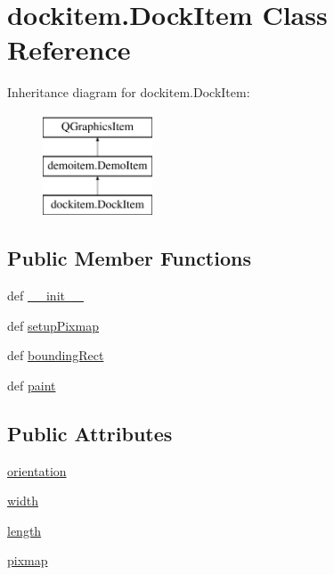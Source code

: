 \hypertarget{classdockitem_1_1DockItem}{}\section{dockitem.\+Dock\+Item Class Reference}
\label{classdockitem_1_1DockItem}
Inheritance diagram for dockitem.\+Dock\+Item\+:\begin{figure}[H]
\begin{center}
\leavevmode
\includegraphics[height=3.000000cm]{classdockitem_1_1DockItem}
\end{center}
\end{figure}
\subsection*{Public Member Functions}
\begin{DoxyCompactItemize}
\item 
def \hyperlink{classdockitem_1_1DockItem_aeb16b7a2201d63902790f436a0c7dafa}{\+\_\+\+\_\+init\+\_\+\+\_\+}
\item 
def \hyperlink{classdockitem_1_1DockItem_a3a46b9c8be0cf26210d91e66bf91cb5a}{setup\+Pixmap}
\item 
def \hyperlink{classdockitem_1_1DockItem_acc00b5b743820857c55f4f1b8e5e8bfb}{bounding\+Rect}
\item 
def \hyperlink{classdockitem_1_1DockItem_a7eef7bfa27c34e5d3ac91efc074d3ed1}{paint}
\end{DoxyCompactItemize}
\subsection*{Public Attributes}
\begin{DoxyCompactItemize}
\item 
\hyperlink{classdockitem_1_1DockItem_afe4ebdd3e8bd8cb5dea6d33f9d1b454b}{orientation}
\item 
\hyperlink{classdockitem_1_1DockItem_afad6a12ebe9540a16acad41cbea79ca8}{width}
\item 
\hyperlink{classdockitem_1_1DockItem_a4b15a3c90db22ac3aefbc0eabfad87b8}{length}
\item 
\hyperlink{classdockitem_1_1DockItem_a437a08fb6f8c3a2266f3242fad8c6fd5}{pixmap}
\end{DoxyCompactItemize}
